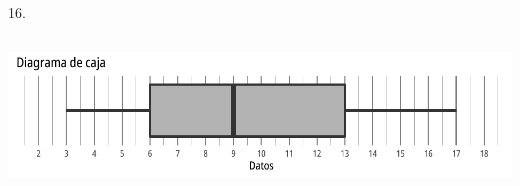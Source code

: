 \documentclass{cdplf-prueba}
\begin{document}
\begin{tasks}
16.\end{tasks}
\subsection{}
\begin{center}\includegraphics{diagrama_caja_1.pdf}\end{center}
\end{document}
